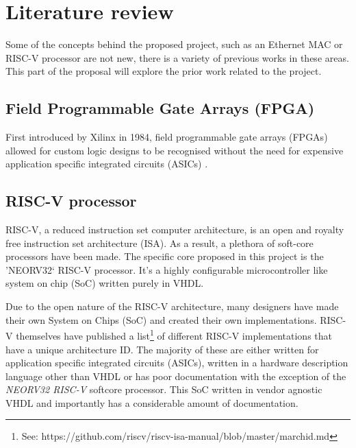 
\chapter[Literature review]{Literature review }
\label{Chap:label}	%
\pagestyle{headings}



Some of the concepts behind the proposed project, such as an Ethernet MAC or RISC-V processor are not new, there is a variety of previous works in these areas. This part of the proposal will explore the prior work related to the project. 


\section{Field Programmable Gate Arrays (FPGA)}
First introduced by Xilinx in 1984, field programmable gate arrays (FPGAs) allowed for custom logic designs to be recognised without the need for 
expensive application specific integrated circuits (ASICs) \cite{30YearsOfFPGA}. 



\section{RISC-V processor}
RISC-V, a reduced instruction set computer architecture, is an open and royalty free instruction set architecture (ISA). As a result, a plethora 
of soft-core processors have been made. The specific core proposed in this project is the 'NEORV32` RISC-V processor. It's a highly configurable 
microcontroller like system on chip (SoC) written purely in VHDL.


Due to the open nature of the RISC-V architecture, many designers have made their own System on Chips (SoC) and created their own implementations. RISC-V 
themselves have published a list\footnote[1]{See: https://github.com/riscv/riscv-isa-manual/blob/master/marchid.md} of different RISC-V implementations 
that have a unique architecture ID. The majority of these are either written for application specific integrated circuits (ASICs), written in a hardware 
description language other than VHDL or has poor documentation with the exception of the  \textit{NEORV32 RISC-V} softcore processor. This SoC written 
in vendor agnostic VHDL and importantly has a considerable amount of documentation. 

